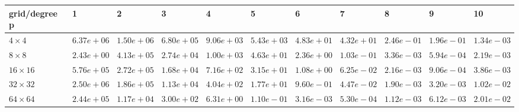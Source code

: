 \begin{tabular}{lllllllllll}
\hline
 grid/degree p   & 1          & 2          & 3          & 4          & 5          & 6          & 7          & 8          & 9          & 10         \\
\hline
 $4 \times 4$    & $6.37e+06$ & $1.50e+06$ & $6.80e+05$ & $9.06e+03$ & $5.43e+03$ & $4.83e+01$ & $4.32e+01$ & $2.46e-01$ & $1.96e-01$ & $1.34e-03$ \\
 $8 \times 8$    & $2.43e+00$ & $4.13e+05$ & $2.74e+04$ & $1.00e+03$ & $4.63e+01$ & $2.36e+00$ & $1.03e-01$ & $3.36e-03$ & $5.94e-04$ & $2.19e-03$ \\
 $16 \times 16$  & $5.76e+05$ & $2.72e+05$ & $1.68e+04$ & $7.16e+02$ & $3.15e+01$ & $1.08e+00$ & $6.25e-02$ & $2.16e-03$ & $9.06e-04$ & $3.86e-03$ \\
 $32 \times 32$  & $2.50e+06$ & $1.86e+05$ & $1.13e+04$ & $4.04e+02$ & $1.77e+01$ & $9.60e-01$ & $4.47e-02$ & $1.90e-03$ & $3.20e-03$ & $1.02e-02$ \\
 $64 \times 64$  & $2.44e+05$ & $1.17e+04$ & $3.00e+02$ & $6.31e+00$ & $1.10e-01$ & $3.16e-03$ & $5.30e-04$ & $1.12e-03$ & $6.12e-03$ & $2.01e-02$ \\
\hline
\end{tabular}
